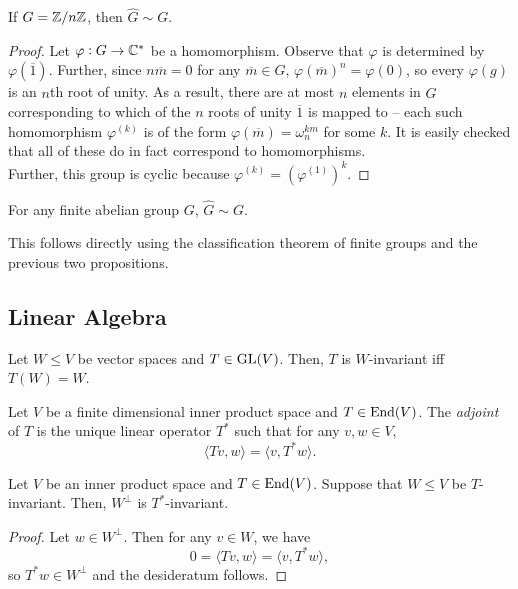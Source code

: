 		\begin{prop}
			\label{prop: deg-one reps of ZnZ}
			If $G = \mathbb{Z}/n\mathbb{Z}$, then $\hat{G} \sim G$.
		\end{prop}
		\begin{proof}
			Let $\varphi : G \to \mathbb{C}^*$ be a homomorphism. Observe that $\varphi$ is determined by $\varphi(\overline{1})$. Further, since $n\overline{m} = 0$ for any $\overline{m} \in G$, $\varphi(\overline{m})^n = \varphi(0)$, so every $\varphi(g)$ is an $n$th root of unity. As a result, there are at most $n$ elements in $\hat{G}$ corresponding to which of the $n$ roots of unity $\overline{1}$ is mapped to -- each such homomorphism $\varphi^{(k)}$ is of the form $\varphi(\overline{m}) = \omega_n^{km}$ for some $k$. It is easily checked that all of these do in fact correspond to homomorphisms.\\
			Further, this group is cyclic because $\varphi^{(k)} = (\varphi^{(1)})^k$.
		\end{proof}

		\begin{theorem}
			\label{theo: finite abelian group dual}
			For any finite abelian group $G$, $\hat{G} \sim G$.
		\end{theorem}
		This follows directly using the classification theorem of finite groups and the previous two propositions.

	\subsection{Linear Algebra}

		\begin{fprop}
			\label{prop: invariant pseudo def}
			Let $W \le V$ be vector spaces and $T \in \operatorname{GL}(V)$. Then, $T$ is $W$-invariant iff $T(W) = W$.
		\end{fprop}

		\begin{fdef}
			Let $V$ be a finite dimensional inner product space and $T \in \operatorname{End}(V)$. The \emph{adjoint} of $T$ is the unique linear operator $T^*$ such that for any $v,w \in V$,
			\[ \langle Tv,w\rangle = \langle v,T^*w\rangle. \]
		\end{fdef}

		\begin{fprop}
			\label{prop: perp is adjoint invariant}
			Let $V$ be an inner product space and $T \in \operatorname{End}(V)$. Suppose that $W \le V$ be $T$-invariant. Then, $W^\perp$ is $T^*$-invariant.
		\end{fprop}
		\begin{proof}
			Let $w \in W^\perp$. Then for any $v \in W$, we have
			\[ 0 = \langle Tv, w \rangle = \langle v, T^*w \rangle,  \]
			so $T^*w \in W^\perp$ and the desideratum follows.
		\end{proof}

